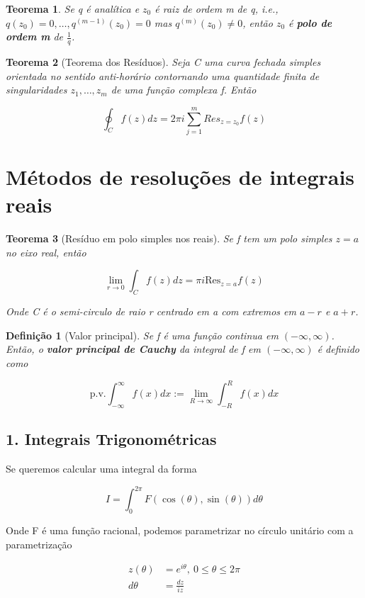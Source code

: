 \documentclass{article}
\newtheorem{theorem}{Teorema}
\newtheorem{definition}{Definição}
\begin{document}
\begin{theorem}
Se q é analítica e $z_0$ é raiz de ordem m de q, i.e., $q(z_0) = 0, \ldots, q^{(m - 1)}(z_0) = 0$ mas $q^{(m)}(z_0) \neq 0$, então $z_0$ é \textbf{polo de ordem m} de $\frac{1}{q}$.
\end{theorem}

\begin{theorem}[Teorema dos Resíduos]
Seja C uma curva fechada simples orientada no sentido anti-horário contornando uma quantidade finita de singularidades $z_1, \ldots, z_m$ de uma função complexa f. Então

$$\oint_C f(z) d z = 2 \pi i \sum_{j = 1}^m Res_{z = z_0} f(z)$$
\end{theorem}

\section*{Métodos de resoluções de integrais reais}
\label{s10}
\begin{theorem}[Resíduo em polo simples nos reais]
Se f tem um polo simples $z = a$ no eixo real, então

\begin{equation*}
    \lim_{r \to 0} \int_C f(z) d z = \pi i \mathrm{Res}_{z = a} f(z)
\end{equation*}

Onde C é o semi-circulo de raio r centrado em a com extremos em $a - r$ e $a + r$.
\end{theorem}

\begin{definition}[Valor principal]
Se f é uma função continua em $(- \infty, \infty)$. Então, o \textbf{valor principal de Cauchy} da integral de f em $(- \infty, \infty)$ é definido como

$$\mathrm{p.v.} \int_{-\infty}^\infty f(x) d x := \lim_{R \to \infty} \int_{-R}^R f(x) d x$$
\end{definition}

\subsection*{1. Integrais Trigonométricas}
Se queremos calcular uma integral da forma

$$I = \int_0^{2\pi} F(\cos(\theta), \sin(\theta)) d \theta $$

Onde F é uma função racional, podemos parametrizar no círculo unitário com a parametrização

\begin{align*}
    z(\theta) &= e^{i \theta},\ 0 \leq \theta \leq 2 \pi \\
    d \theta &= \frac{d z}{i z}
\end{align*}
\end{document}
